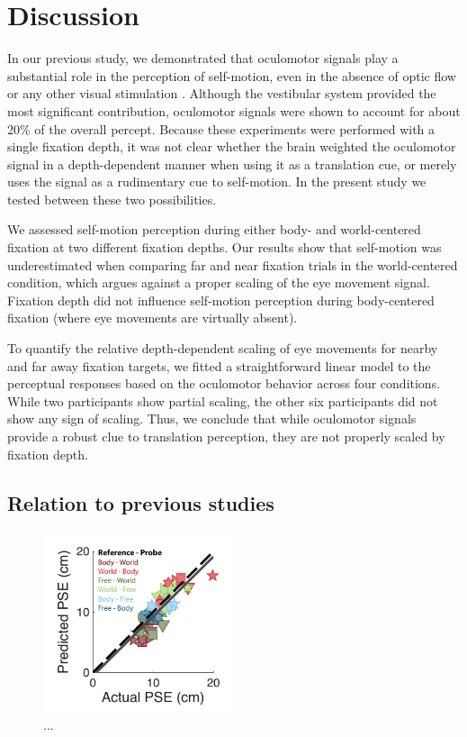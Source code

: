 \section{Discussion}

In our previous study, we demonstrated that oculomotor signals play a substantial role in the perception of self-motion, even in the absence of optic flow or any other visual stimulation \cite{clemens2015a}. Although the vestibular system provided the most significant contribution, oculomotor signals were shown to account for about 20\% of the overall percept. Because these experiments were performed with a single fixation depth, it was not clear whether the brain weighted the oculomotor signal in a depth-dependent manner when using it as a translation cue, or merely uses the signal as a rudimentary cue to self-motion. In the present study we tested between these two possibilities.

We assessed self-motion perception during either body- and world-centered fixation at two different fixation depths. Our results show that self-motion was underestimated when comparing far and near fixation trials in the world-centered condition, which argues against a proper scaling of the eye movement signal. Fixation depth did not influence self-motion perception during body-centered fixation (where eye movements are virtually absent).  

To quantify the relative depth-dependent scaling of eye movements for nearby and far away fixation targets, we fitted a straightforward linear model to the perceptual responses based on the oculomotor behavior across four conditions. While two participants show partial scaling, the other six participants did not show any sign of scaling. Thus, we conclude that while oculomotor signals provide a robust clue to translation perception, they are not properly scaled by fixation depth.


\subsection{Relation to previous studies}

\begin{figure}
    \includegraphics[width=0.5\textwidth]{src/paper4/p4_figure6.pdf}

    \caption{...}
    \label{p4:fig6}
\end{figure}

